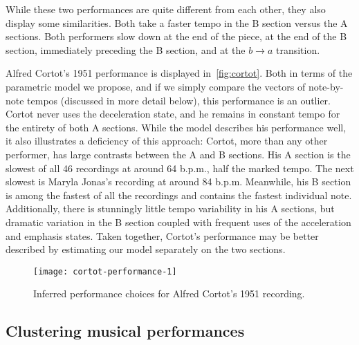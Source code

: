 \documentclass[12pt]{article}
\begin{document}
While these two performances are quite different from each other, they
also display some similarities. Both take a faster tempo in the B
section versus the A sections. Both performers slow down at the end of
the piece, at the end of the B section, immediately preceding the B section, and at the
$b\rightarrow a$ transition.

Alfred Cortot's 1951 performance is displayed
in~\autoref{fig:cortot}. Both in terms of the parametric model we
propose, and if we simply compare the vectors of note-by-note tempos
(discussed in more detail below), this performance is an
outlier. Cortot never uses the deceleration state, and he remains in
constant tempo for the entirety of both A sections. While the model
describes his performance well, it also illustrates a deficiency of
this approach: Cortot, more than any other performer, has large
contrasts between the A and B sections. His A section is the slowest
of all 46 recordings at around 64 b.p.m., half the marked
tempo. The next slowest is Maryla Jonas's recording at around 84
b.p.m. Meanwhile, his B section is among the fastest of all the
recordings and contains the fastest individual note. Additionally,
there is stunningly little tempo variability in his A sections, but
dramatic variation in the B section coupled with frequent uses of the
acceleration and emphasis states. Taken together, Cortot's performance
may be better described by estimating our model separately on the two sections.
\begin{figure}[t]
  \centering
    \texttt{[image: cortot-performance-1]}
  \caption{Inferred performance choices for Alfred Cortot's 1951
    recording.}
  \label{fig:cortot}
\end{figure}

\subsection{Clustering musical performances}
\label{sec:clust-music-perf}
\end{document}
